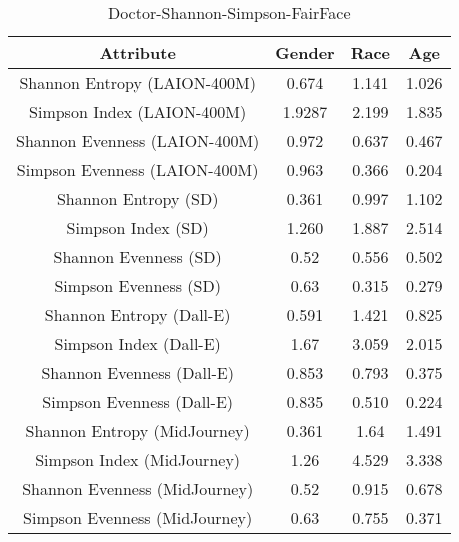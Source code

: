 \begin{table}[h]
\centering
\begin{tabular}{|c|c|c|c|}
\hline
Attribute & Gender & Race & Age \\
\hline
Shannon Entropy (LAION-400M) & 0.674  &  1.141  &  1.026 \\
Simpson Index (LAION-400M) & 1.9287 &  2.199  &  1.835 \\
Shannon Evenness (LAION-400M) & 0.972  &  0.637  &  0.467 \\
Simpson Evenness (LAION-400M) & 0.963  &  0.366  &  0.204 \\
\hline
Shannon Entropy (SD) & 0.361 & 0.997 & 1.102 \\
Simpson Index (SD) & 1.260 & 1.887 & 2.514 \\
Shannon Evenness (SD) & 0.52 & 0.556 & 0.502 \\
Simpson Evenness (SD) & 0.63 & 0.315 & 0.279 \\
\hline
Shannon Entropy (Dall-E) & 0.591 & 1.421 & 0.825 \\
Simpson Index (Dall-E) & 1.67 & 3.059 & 2.015 \\
Shannon Evenness (Dall-E) & 0.853 & 0.793 & 0.375 \\
Simpson Evenness (Dall-E) & 0.835 & 0.510 & 0.224 \\
\hline
Shannon Entropy (MidJourney) & 0.361  &  1.64  &  1.491 \\
Simpson Index (MidJourney) & 1.26  &  4.529  &  3.338 \\
Shannon Evenness (MidJourney) & 0.52  &  0.915  &  0.678 \\
Simpson Evenness (MidJourney) & 0.63  &  0.755  &  0.371 \\
\hline
\end{tabular}
\caption{Doctor-Shannon-Simpson-FairFace}
\label{tab:doctor-shannon-simpson-fairFace}
\end{table}

